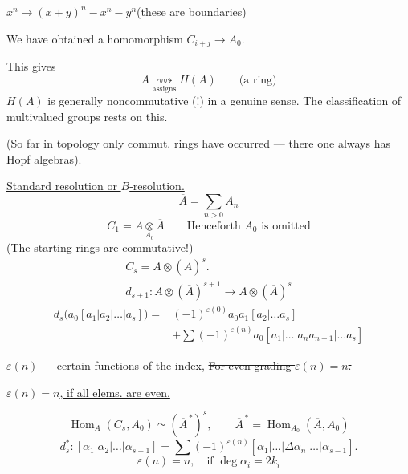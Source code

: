 $x^n\longrightarrow(x+y)^n-x^n-y^n$\qquad (these are boundaries)





We have obtained a homomorphism $C_{i+j}\longrightarrow A_0$.


This gives
\[
A\underset{\text{assigns}}{\rightsquigarrow}H(A)
\qquad\text{(a ring)}
\]
$H(A)$ is generally noncommutative (!) in a genuine sense.
The classification of multivalued groups rests on this.

(So far in topology only commut. rings have occurred — there one always has Hopf algebras).

\uline{Standard resolution or \mbox{$B$}-resolution.}
\[
\overline A=\sum_{n>0}A_n
\]
\[
C_1=A\underset{A_0}{\otimes}\overline A
\qquad\text{Henceforth }A_0\text{ is omitted}
\]
(The starting rings are commutative!)
\[
\begin{gathered}
C_s=A\otimes(\overline A)^s.\\
d_{s+1}\colon A\otimes(\overline A)^{s+1}
\longrightarrow A\otimes(\overline A)^s
\end{gathered}
\]
\[
\begin{aligned}
d_s\bigl(a_0[a_1|a_2|\ldots|a_s]\bigr)
={}&(-1)^{\varepsilon(0)}a_0a_1[a_2|\ldots a_s]\\
 &+\sum(-1)^{\varepsilon(n)}a_0[a_1|\ldots|a_na_{n+1}|\ldots a_s]
\end{aligned}
\]


$\varepsilon(n)$ — certain functions of the index,
\sout{For even grading \mbox{$\varepsilon(n)=n$}.}
\par\uline{\mbox{$\varepsilon(n)=n$}, if all elems. are even.}


\[
\operatorname{Hom}_A(C_s,A_0)\simeq(\overline A^{\,*})^s,
\qquad \overline A^{\,*}=\operatorname{Hom}_{A_0}(\overline A,A_0)
\]
\[
d_s^*\colon[\alpha_1|\alpha_2|\ldots|\alpha_{s-1}]
=\sum(-1)^{\varepsilon(n)}
[\alpha_1|\ldots|\overline\Delta\alpha_n|\ldots|\alpha_{s-1}].
\]
\[
\varepsilon(n)=n,\quad\text{if }\deg\alpha_i=2k_i
\]

